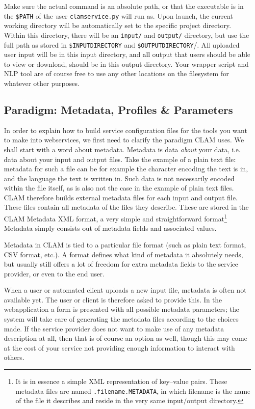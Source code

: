 \documentclass[a4paper,12pt]{report}
\begin{document}
Make sure the actual command is an absolute path, or that the executable is in
the \texttt{\$PATH} of the user \texttt{clamservice.py} will run as. Upon
launch, the current working directory will be automatically set to the specific
project directory. Within this directory, there will be an \texttt{input/} and
\texttt{output/} directory, but use the full path as stored in
\texttt{\$INPUTDIRECTORY} and \texttt{\$OUTPUTDIRECTORY}/. All uploaded user
input will be in this input directory, and all output that users should be able
to view or download, should be in this output directory. Your wrapper script
and NLP tool are of course free to use any other locations on the filesystem
for whatever other purposes.


\subsection{Paradigm: Metadata, Profiles \& Parameters}

In order to explain how to build service configuration files for the tools you
want to make into webservices, we first need to clarify the paradigm CLAM uses.
We shall start with a word about metadata. Metadata is data \emph{about}\/ your
data, i.e. data about your input and output files. Take the example of a plain
text file: metadata for such a file can be for example the character encoding
the text is in, and the language the text is written in. Such data is not
necessarily encoded within the file itself, as is also not the case in the
example of plain text files. CLAM therefore builds external metadata files for
each input and output file. These files contain all metadata of the files they
describe. These are stored in the CLAM Metadata XML format, a very simple and
straightforward format\footnote{It is in essence a simple XML representation of
key--value pairs. These metadata files are named \texttt{.filename.METADATA},
in which filename is the name of the file it describes and reside in the very
same input/output directory.} Metadata simply consists out of metadata fields
and associated values.

Metadata in CLAM is tied to a particular file format (such as plain text
format, CSV format, etc.). A format defines what kind of metadata it absolutely
needs, but usually still offers a lot of freedom for extra metadata fields to
the service provider, or even to the end user. 

When a user or automated client uploads a new input file, metadata is often not
available yet. The user or client is therefore asked to provide this. In the
webapplication a form is presented with all possible metadata parameters; the
system will take care of generating the metadata files according to the choices
made. If the service provider does not want to make use of any metadata
description at all, then that is of course an option as well, though this may
come at the cost of your service not providing enough information to interact
with others.
\end{document}
